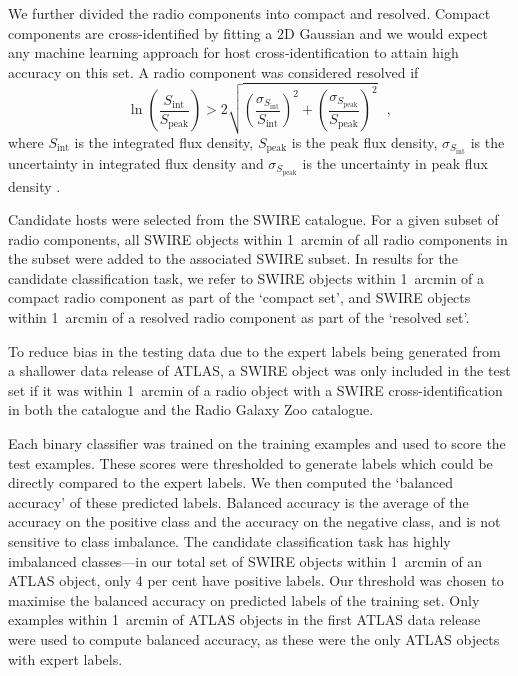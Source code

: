     We further divided the radio components into compact and resolved. Compact
    components are cross-identified by fitting a 2D Gaussian \citep[as
    in][]{norris06} and we would expect any machine learning approach for host
    cross-identification to attain high accuracy on this set. A radio component was
    considered resolved if
    \begin{equation}
      \label{eq:atlas-compact}
        \ln \left(
          \frac{S_{\text{int}}}
               {S_{\text{peak}}}
        \right) > 2\sqrt{\left(
          \frac{\sigma_{S_{\text{int}}}}
               {S_{\text{int}}}
        \right)^2 + \left(
          \frac{\sigma_{S_{\text{peak}}}}
               {S_{\text{peak}}}
        \right)^2}\,\,\,\,,
    \end{equation}%
    where \(S_{\text{int}}\) is the integrated flux density,
    \(S_{\text{peak}}\) is the peak flux density, {$\sigma_{S_{\text{int}}}$ is
    the uncertainty in integrated flux density and $\sigma_{S_{\text{peak}}}$
    is the uncertainty in peak flux density} \citep[following][]{franzen15}.

    Candidate hosts were selected from the SWIRE catalogue. For a given subset
    of radio components, all SWIRE objects within 1~arcmin of all radio
    components in the subset were added to the associated SWIRE subset. In results
    for the candidate classification task, we refer to SWIRE objects
    within 1~arcmin of a compact radio component as part of the `compact set',
    and SWIRE objects within 1~arcmin of a resolved radio component as part of
    the `resolved set'.

    To reduce bias in the testing data due to the expert labels being
    generated from a shallower data release of ATLAS, a SWIRE object was only
    included in the test set if it was within 1~arcmin of a radio object with
    a SWIRE cross-identification in both the \citet{norris06} catalogue and the
    Radio Galaxy Zoo catalogue.

    Each binary classifier was trained on the training examples and used to
    {score the test examples. These scores were thresholded to generate labels which could be directly compared
    to the expert labels. We then computed the `balanced accuracy' of these predicted labels.} Balanced
    accuracy is the average of the accuracy on the positive class and the
    accuracy on the negative class, and is not sensitive to class imbalance.
    The candidate classification task has highly imbalanced classes---in our
    total set of SWIRE objects within 1~arcmin of an ATLAS object, only 4 per
    cent have positive labels. {Our threshold was chosen to maximise the balanced
    accuracy on predicted labels of the training set.} Only examples within 1~arcmin of ATLAS objects
    in the first ATLAS data release \citep{norris06} were used to compute
    balanced accuracy, as these were the only ATLAS objects with expert labels.

